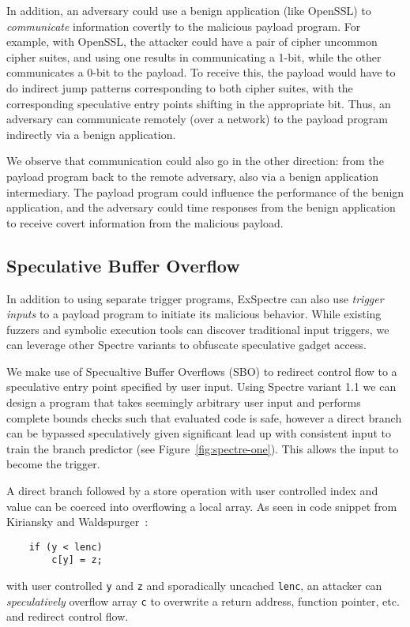 \medskip

In addition, an adversary could use a benign application (like OpenSSL) to
\emph{communicate} information covertly to the malicious payload program. For
example, with OpenSSL, the attacker could have a pair of cipher uncommon cipher
suites, and using one results in communicating a 1-bit, while the other
communicates a 0-bit to the payload. To receive this, the payload would have to
do indirect jump patterns corresponding to both cipher suites, with the
corresponding speculative entry points shifting in the appropriate bit. Thus, an
adversary can communicate remotely (over a network) to the payload program
indirectly via a benign application.

We observe that communication could also go in the other direction: from
the payload program back to the remote adversary, also via a benign application
intermediary. The payload program could influence the performance of the benign
application, and the adversary could time responses from the benign application
to receive covert information from the malicious payload.





\subsection{Speculative Buffer Overflow}

\FigSpectreOne

In addition to using separate trigger programs, ExSpectre can also use
\emph{trigger inputs} to a payload program to initiate its malicious behavior.
While existing fuzzers and symbolic execution tools can discover traditional
input triggers, we can leverage other Spectre variants to obfuscate speculative
gadget access. 

We make use of Specualtive Buffer Overflows (SBO) to redirect control flow
to a speculative entry point specified by user input. Using Spectre variant 1.1 
we can design a program that takes seemingly arbitrary user input and performs complete 
bounds checks such that evaluated code is safe, however a direct branch can
be bypassed speculatively given significant lead up with consistent input 
to train the branch predictor (see Figure~\ref{fig:spectre-one}). This allows the input
to become the trigger. 

A direct branch followed by a store operation with user controlled index and
value can be coerced into overflowing a local array. 
As seen in code snippet from Kiriansky and Waldspurger~\cite{kiriansky2018speculative}:
\begin{lstlisting}
    if (y < lenc)
        c[y] = z;
\end{lstlisting}
with user controlled 
\texttt{y} and \texttt{z} and sporadically uncached \texttt{lenc}, an attacker 
can \textit{speculatively} overflow array \texttt{c}
to overwrite a return address, function pointer, etc. and redirect control flow.

